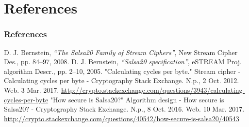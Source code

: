 \section{References}

\begin{frame}
\frametitle{References}

\begin{thebibliography}{100}
 D. J. Bernstein, \emph{“The Salsa20 Family of Stream Ciphers”}, New Stream Cipher Des., pp. 84–97, 2008.
 D. J. Bernstein, \emph{“Salsa20 specification”}, eSTREAM Proj. algorithm Descr., pp. 2–10, 2005.
 "Calculating cycles per byte." Stream cipher - Calculating cycles per byte - Cryptography Stack Exchange. N.p., 2 Oct. 2012. Web. 3 Mar. 2017. \newline \url{http://crypto.stackexchange.com/questions/3943/calculating-cycles-per-byte} 
 "How secure is Salsa20?" Algorithm design - How secure is Salsa20? - Cryptography Stack Exchange. N.p., 8 Oct. 2016. Web. 10 Mar. 2017. \newline \url{http://crypto.stackexchange.com/questions/40542/how-secure-is-salsa20/40543} 

\end{thebibliography}
\end{frame}

